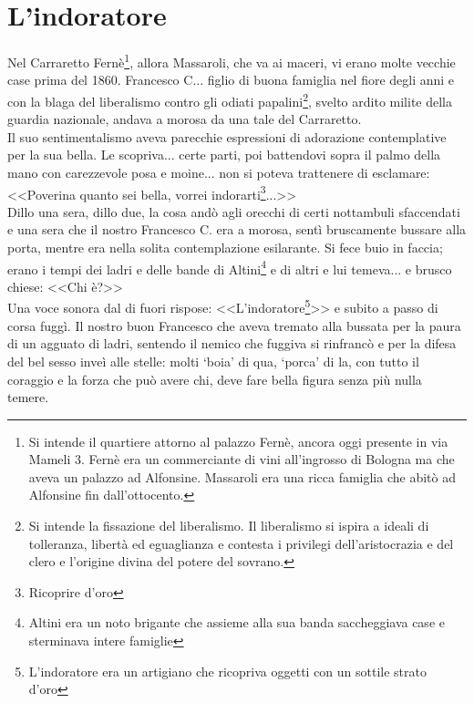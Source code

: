 
\chapter{L'indoratore}
Nel Carraretto Fernè\footnote{Si intende il quartiere attorno al palazzo Fernè, ancora oggi presente in via Mameli 3. Fernè era un commerciante di vini all'ingrosso di Bologna ma che aveva un palazzo ad Alfonsine. Massaroli era una ricca famiglia che abitò ad Alfonsine fin dall'ottocento.}, allora Massaroli, che va ai maceri, vi erano molte vecchie case prima del 1860. Francesco C... figlio di buona famiglia nel fiore degli anni e con la blaga del liberalismo contro gli odiati papalini\footnote{Si intende la fissazione del liberalismo. Il liberalismo si ispira a ideali di tolleranza, libertà ed eguaglianza e contesta i privilegi dell'aristocrazia e del clero e l'origine divina del potere del sovrano.}, svelto ardito milite della guardia nazionale, andava a morosa da una tale del Carraretto. \\
Il suo sentimentalismo aveva parecchie espressioni di adorazione contemplative per la sua bella.
Le scopriva... certe parti, poi battendovi sopra il palmo della mano con carezzevole posa e moine... non si poteva trattenere di esclamare:\\
\indent <<Poverina quanto sei bella, vorrei indorarti\footnote{Ricoprire d'oro}...>>\\
Dillo una sera, dillo due, la cosa andò agli orecchi di certi nottambuli sfaccendati e una sera che il nostro Francesco C. era a morosa, sentì bruscamente bussare alla porta, mentre era nella solita contemplazione esilarante.
Si fece buio in faccia; erano i tempi dei ladri e delle bande di Altini\footnote{Altini era un noto brigante che assieme alla sua banda saccheggiava case e sterminava intere famiglie} e di altri e lui temeva... e brusco chiese: <<Chi è?>>\\
Una voce sonora dal di fuori rispose: <<L'indoratore\footnote{L'indoratore era un artigiano che ricopriva oggetti con un sottile strato d'oro}>> e subito a passo di corsa fuggì.
Il nostro buon Francesco che aveva tremato alla bussata per la paura di un agguato di ladri, sentendo il nemico che fuggiva si rinfrancò e per la difesa del bel sesso inveì alle stelle: molti ‘boia' di qua, ‘porca' di la, con tutto il coraggio e la forza che può avere chi, deve fare bella figura senza più nulla temere. 
